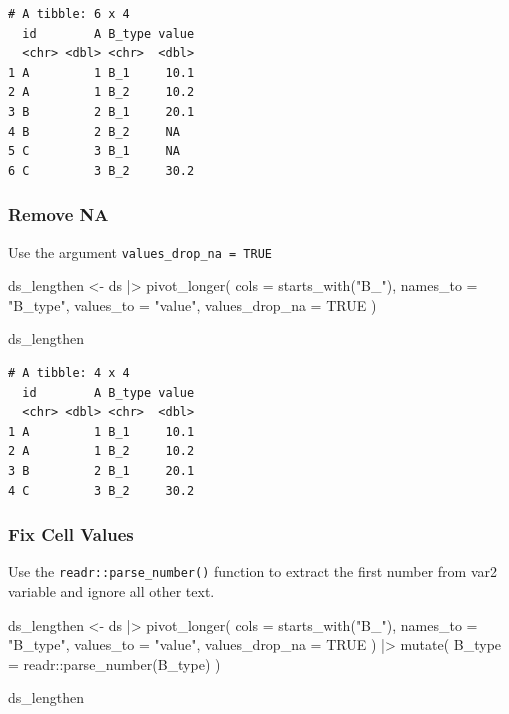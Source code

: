 \documentclass[
  letterpaper,
  DIV=11,
  numbers=noendperiod]{scrreprt}
\newenvironment{Shaded}{\begin{snugshade}}{\end{snugshade}}
\newcommand{\AttributeTok}[1]{\textcolor[rgb]{0.40,0.45,0.13}{#1}}
\newcommand{\ConstantTok}[1]{\textcolor[rgb]{0.56,0.35,0.01}{#1}}
\newcommand{\FunctionTok}[1]{\textcolor[rgb]{0.28,0.35,0.67}{#1}}
\newcommand{\NormalTok}[1]{\textcolor[rgb]{0.00,0.23,0.31}{#1}}
\newcommand{\OtherTok}[1]{\textcolor[rgb]{0.00,0.23,0.31}{#1}}
\newcommand{\SpecialCharTok}[1]{\textcolor[rgb]{0.37,0.37,0.37}{#1}}
\newcommand{\StringTok}[1]{\textcolor[rgb]{0.13,0.47,0.30}{#1}}
\begin{document}
\begin{verbatim}
# A tibble: 6 x 4
  id        A B_type value
  <chr> <dbl> <chr>  <dbl>
1 A         1 B_1     10.1
2 A         1 B_2     10.2
3 B         2 B_1     20.1
4 B         2 B_2     NA  
5 C         3 B_1     NA  
6 C         3 B_2     30.2
\end{verbatim}

\subsubsection{Remove NA}\label{remove-na}

Use the argument \texttt{values\_drop\_na\ =\ TRUE}

\begin{Shaded}
\begin{Highlighting}[]
\NormalTok{ds\_lengthen }\OtherTok{\textless{}{-}}\NormalTok{ ds }\SpecialCharTok{|\textgreater{}} 
  \FunctionTok{pivot\_longer}\NormalTok{(}
    \AttributeTok{cols =} \FunctionTok{starts\_with}\NormalTok{(}\StringTok{"B\_"}\NormalTok{),}
    \AttributeTok{names\_to =} \StringTok{"B\_type"}\NormalTok{,}
    \AttributeTok{values\_to =} \StringTok{"value"}\NormalTok{,}
    \AttributeTok{values\_drop\_na =} \ConstantTok{TRUE}
\NormalTok{  )}

\NormalTok{ds\_lengthen}
\end{Highlighting}
\end{Shaded}

\begin{verbatim}
# A tibble: 4 x 4
  id        A B_type value
  <chr> <dbl> <chr>  <dbl>
1 A         1 B_1     10.1
2 A         1 B_2     10.2
3 B         2 B_1     20.1
4 C         3 B_2     30.2
\end{verbatim}

\subsubsection{Fix Cell Values}\label{fix-cell-values}

Use the \texttt{readr::parse\_number()} function to extract the first
number from var2 variable and ignore all other text.

\begin{Shaded}
\begin{Highlighting}[]
\NormalTok{ds\_lengthen }\OtherTok{\textless{}{-}}\NormalTok{ ds }\SpecialCharTok{|\textgreater{}} 
  \FunctionTok{pivot\_longer}\NormalTok{(}
    \AttributeTok{cols =} \FunctionTok{starts\_with}\NormalTok{(}\StringTok{"B\_"}\NormalTok{),}
    \AttributeTok{names\_to =} \StringTok{"B\_type"}\NormalTok{,}
    \AttributeTok{values\_to =} \StringTok{"value"}\NormalTok{,}
    \AttributeTok{values\_drop\_na =} \ConstantTok{TRUE}
\NormalTok{  ) }\SpecialCharTok{|\textgreater{}} 
  \FunctionTok{mutate}\NormalTok{(}
    \AttributeTok{B\_type =}\NormalTok{ readr}\SpecialCharTok{::}\FunctionTok{parse\_number}\NormalTok{(B\_type)}
\NormalTok{  )}

\NormalTok{ds\_lengthen}
\end{Highlighting}
\end{Shaded}
\end{document}
